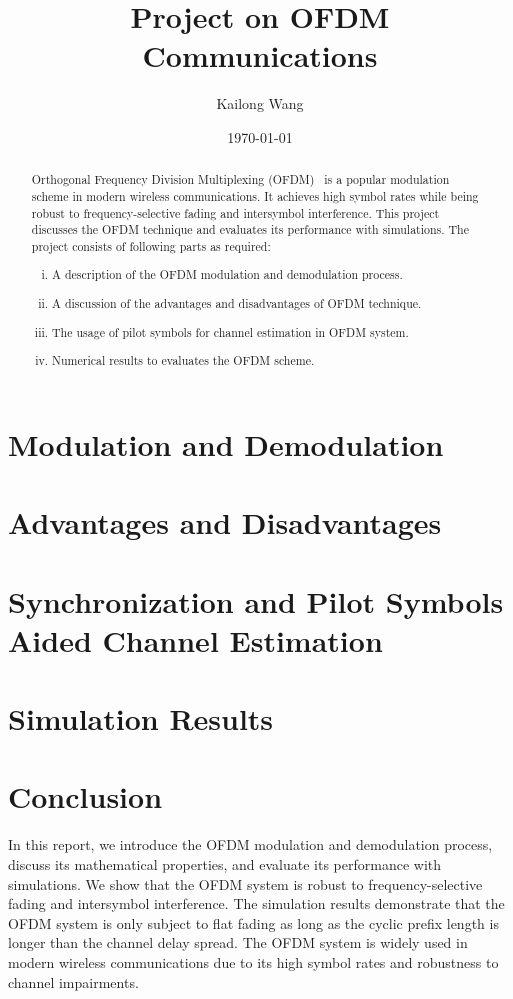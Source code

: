\documentclass{article}
\title{Project on OFDM Communications}
\author{Kailong Wang}
\date{\today}
\begin{document}
\maketitle

\begin{abstract}
    Orthogonal Frequency Division Multiplexing (OFDM)~\cite{5307460} is a popular modulation scheme in modern wireless communications. It achieves high symbol rates while being robust to frequency-selective fading and intersymbol interference. This project discusses the OFDM technique and evaluates its performance with simulations. The project consists of following parts as required:
    \begin{enumerate}[(i)]
        \item A description of the OFDM modulation and demodulation process.
        \item A discussion of the advantages and disadvantages of OFDM technique.
        \item The usage of pilot symbols for channel estimation in OFDM system.
        \item Numerical results to evaluates the OFDM scheme.
    \end{enumerate}
\end{abstract}

\section{Modulation and Demodulation}
\label{sec:modulation}


\section{Advantages and Disadvantages}


\section{Synchronization and Pilot Symbols Aided Channel Estimation}


\section{Simulation Results}


\section{Conclusion}
In this report, we introduce the OFDM modulation and demodulation process, discuss its mathematical properties, and evaluate its performance with simulations. We show that the OFDM system is robust to frequency-selective fading and intersymbol interference. The simulation results demonstrate that the OFDM system is only subject to flat fading as long as the cyclic prefix length is longer than the channel delay spread. The OFDM system is widely used in modern wireless communications due to its high symbol rates and robustness to channel impairments.

\clearpage
\printbibliography
\end{document}
